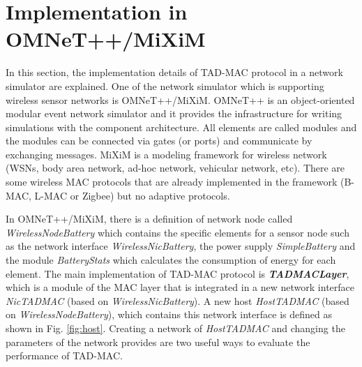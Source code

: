 \documentclass[conference]{IEEEtran}
\begin{document}
\section{Implementation in OMNeT++/MiXiM}
\label{sec:implementation}
In this section, the implementation details of TAD-MAC protocol in a network simulator are explained. One of the network simulator which is supporting wireless sensor networks is OMNeT++/MiXiM. OMNeT++ is an object-oriented modular event network simulator and it provides the infrastructure for writing simulations with the component architecture. All elements are called modules and the modules can be connected via gates (or ports) and communicate by exchanging messages. MiXiM is a modeling framework for wireless network (WSNs, body area network, ad-hoc network, vehicular network, etc). There are some wireless MAC protocols that are already implemented in the framework (B-MAC, L-MAC or Zigbee) but no adaptive protocols.

In OMNeT++/MiXiM, there is a definition of network node called \textit{WirelessNodeBattery} which contains the specific elements for a sensor node such as the network interface \textit{WirelessNicBattery}, the power supply \textit{SimpleBattery} and the module \textit{BatteryStats} which calculates the consumption of energy for each element. The main  implementation of TAD-MAC protocol is \textit{\textbf{TADMACLayer}}, which is a module of the MAC layer that is integrated in a new network interface \textit{NicTADMAC} (based on \textit{WirelessNicBattery}). A new host \textit{HostTADMAC} (based on \textit{WirelessNodeBattery}), which contains this network interface is defined as shown in Fig. \ref{fig:host}. Creating a network of \textit{HostTADMAC} and changing the parameters of the network provides are two useful ways to evaluate the performance of TAD-MAC.
\end{document}

